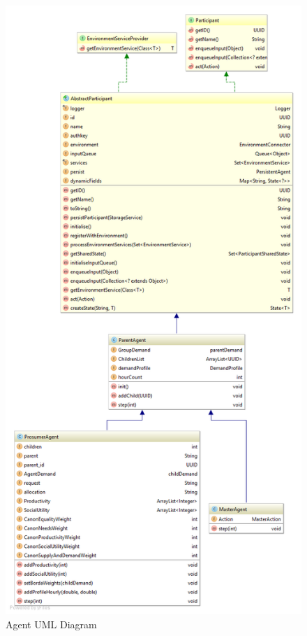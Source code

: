 \begin{figure}[!h]
	\centering
	\includegraphics[scale=0.4]{Images/AgentUML.png}
	\caption{Agent UML Diagram}
	\label{fig:AgentUML}
\end{figure}

